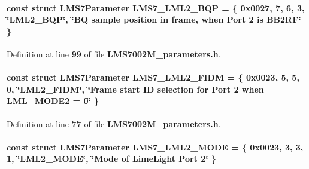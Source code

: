 \paragraph[{L\+M\+S7\+\_\+\+L\+M\+L2\+\_\+\+B\+QP}]{\setlength{\rightskip}{0pt plus 5cm}const struct {\bf L\+M\+S7\+Parameter} L\+M\+S7\+\_\+\+L\+M\+L2\+\_\+\+B\+QP = \{ 0x0027, 7, 6, 3, \char`\"{}\+L\+M\+L2\+\_\+\+B\+Q\+P\char`\"{}, \char`\"{}\+B\+Q sample position in frame, when Port 2 is B\+B2\+R\+F\char`\"{} \}\hspace{0.3cm}{\ttfamily [static]}}\label{LMS7002M__parameters_8h_a7878e2e4dcd1c0c003eeeb1a51c5c9dd}


Definition at line {\bf 99} of file {\bf L\+M\+S7002\+M\+\_\+parameters.\+h}.

\paragraph[{L\+M\+S7\+\_\+\+L\+M\+L2\+\_\+\+F\+I\+DM}]{\setlength{\rightskip}{0pt plus 5cm}const struct {\bf L\+M\+S7\+Parameter} L\+M\+S7\+\_\+\+L\+M\+L2\+\_\+\+F\+I\+DM = \{ 0x0023, 5, 5, 0, \char`\"{}\+L\+M\+L2\+\_\+\+F\+I\+D\+M\char`\"{}, \char`\"{}\+Frame start I\+D selection for Port 2 when L\+M\+L\+\_\+\+M\+O\+D\+E2 = 0\char`\"{} \}\hspace{0.3cm}{\ttfamily [static]}}\label{LMS7002M__parameters_8h_ae8f7d62631e1d4c3debc45d050ddd626}


Definition at line {\bf 77} of file {\bf L\+M\+S7002\+M\+\_\+parameters.\+h}.

\paragraph[{L\+M\+S7\+\_\+\+L\+M\+L2\+\_\+\+M\+O\+DE}]{\setlength{\rightskip}{0pt plus 5cm}const struct {\bf L\+M\+S7\+Parameter} L\+M\+S7\+\_\+\+L\+M\+L2\+\_\+\+M\+O\+DE = \{ 0x0023, 3, 3, 1, \char`\"{}\+L\+M\+L2\+\_\+\+M\+O\+D\+E\char`\"{}, \char`\"{}\+Mode of Lime\+Light Port 2\char`\"{} \}\hspace{0.3cm}{\ttfamily [static]}}\label{LMS7002M__parameters_8h_a9eebbbf34b2e74dd5980722345dedb62}


